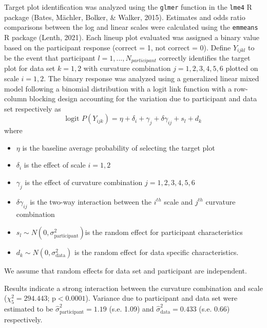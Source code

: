 \documentclass[print]{nuthesis}
\begin{document}
Target plot identification was analyzed using the \texttt{glmer} function in the \texttt{lme4} R package (Bates, Mächler, Bolker, \& Walker, 2015).
Estimates and odds ratio comparisons between the log and linear scales were calculated using the \texttt{emmeans} R package (Lenth, 2021).
Each lineup plot evaluated was assigned a binary value based on the participant response (correct = 1, not correct = 0).
Define \(Y_{ijkl}\) to be the event that participant \(l = 1,...,N_{participant}\) correctly identifies the target plot for data set \(k = 1,2\) with curvature combination \(j = 1,2,3,4,5,6\) plotted on scale \(i = 1,2\).
The binary response was analyzed using a generalized linear mixed model following a binomial distribution with a logit link function with a row-column blocking design accounting for the variation due to participant and data set respectively as
\begin{equation}
\text{logit }P(Y_{ijk}) = \eta + \delta_i + \gamma_j + \delta \gamma_{ij} + s_l + d_k
\end{equation}
\noindent where

\begin{itemize}
\item $\eta$ is the baseline average probability of selecting the target plot
\item $\delta_i$ is the effect of scale $i = 1,2$
\item $\gamma_j$ is the effect of curvature combination $j = 1,2,3,4,5,6$
\item $\delta\gamma_{ij}$ is the two-way interaction between the $i^{th}$ scale and $j^{th}$ curvature combination
\item $s_l \sim N(0,\sigma^2_\text{participant})$is the random effect for participant characteristics
\item $d_k \sim N(0,\sigma^2_{\text{data}})$ is the random effect for data specific characteristics. 
\end{itemize}

\noindent We assume that random effects for data set and participant are independent.

Results indicate a strong interaction between the curvature combination and scale (\(\chi^2_5 = 294.443\); \(\text{p} <0.0001\)). Variance due to participant and data set were estimated to be \(\hat\sigma^2_{\text{participant}} = 1.19\) (s.e. 1.09) and \(\hat\sigma^2_{\text{data}} = 0.433\) (s.e. 0.66) respectively.
\end{document}
